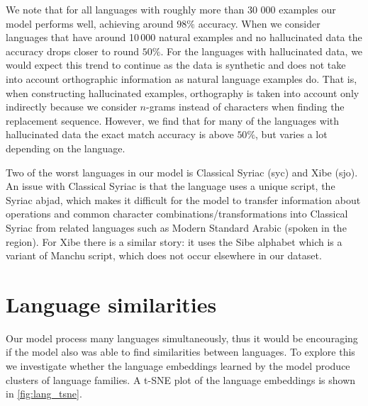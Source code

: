 \documentclass[11pt,a4paper]{article}
\begin{document}
We note that for all languages with roughly more than 30 000 examples
our model performs well, achieving around $98\%$ accuracy. When
we consider languages that have around 10\,000 natural examples and
no hallucinated data the accuracy drops closer to round $50\%$. For
the languages with hallucinated data, we would expect this trend to
continue as the data is synthetic and does not take into account
orthographic information as natural language examples do.  That is,
when constructing hallucinated examples, orthography is taken into
account only indirectly because we consider $n$-grams instead of
characters when finding the replacement sequence. However, we find
that for many of the languages with hallucinated data the exact match
accuracy is above $50\%$, but varies a lot depending on the language.

Two of the worst languages in our model is Classical Syriac (syc) and
Xibe (sjo).  An issue with Classical Syriac is that the language uses
a unique script, the Syriac abjad, which makes it difficult for the
model to transfer information about operations and common character
combinations/transformations into Classical Syriac from related
languages such as Modern Standard Arabic (spoken in the region). For
Xibe there is a similar story: it uses the Sibe alphabet which is a
variant of Manchu script, which does not occur elsewhere in our
dataset.



\section{Language similarities}

Our model process many languages simultaneously, thus it would be
encouraging if the model also was able to find similarities between
languages.  To explore this we investigate whether the language
embeddings learned by the model produce clusters of language
families. A t-SNE plot of the language embeddings is shown in
\cref{fig:lang_tsne}.
\end{document}
